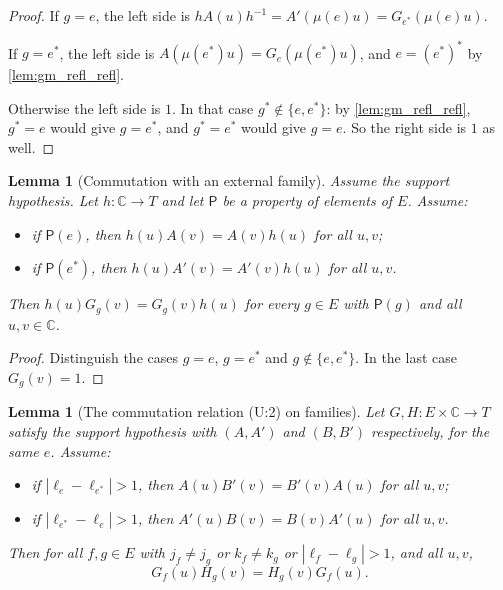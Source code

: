 \documentclass[11pt]{article}
\newtheorem{lemma}[theorem]{Lemma}
\theoremstyle{definition}
\theoremstyle{remark}
\newcommand{\CC}{\mathbb{C}}
\begin{document}
\begin{proof}
If $g=e$, the left side is $hA(u)h^{-1}=A'(\mu(e)u)=G_{e^\ast}(\mu(e)u)$.

If $g=e^\ast$, the left side is $A(\mu(e^\ast)u)=G_e(\mu(e^\ast)u)$, and $e=(e^\ast)^\ast$ by \cref{lem:gm_refl_refl}.

Otherwise the left side is $1$. In that case $g^\ast\notin\{e,e^\ast\}$: by \cref{lem:gm_refl_refl}, $g^\ast=e$ would give $g=e^\ast$, and $g^\ast=e^\ast$ would give $g=e$. So the right side is $1$ as well.
\end{proof}

\begin{lemma}[Commutation with an external family]\label{lem:gm_fam_comm1}
Assume the support hypothesis. Let $h\colon\CC\to T$ and let $\mathsf P$ be a property of elements of $E$. Assume:
\begin{itemize}
\item if $\mathsf P(e)$, then $h(u)A(v)=A(v)h(u)$ for all $u,v$;
\item if $\mathsf P(e^\ast)$, then $h(u)A'(v)=A'(v)h(u)$ for all $u,v$.
\end{itemize}
Then $h(u)G_g(v)=G_g(v)h(u)$ for every $g\in E$ with $\mathsf P(g)$ and all $u,v\in\CC$.
\end{lemma}

\begin{proof}
Distinguish the cases $g=e$, $g=e^\ast$ and $g\notin\{e,e^\ast\}$. In the last case $G_g(v)=1$.
\end{proof}

\begin{lemma}[The commutation relation (U:2) on families]\label{lem:gm_fam_U2}
Let $G,H\colon E\times\CC\to T$ satisfy the support hypothesis with $(A,A')$ and $(B,B')$ respectively, for the same $e$. Assume:
\begin{itemize}
\item if $|\ell_e-\ell_{e^\ast}|>1$, then $A(u)B'(v)=B'(v)A(u)$ for all $u,v$;
\item if $|\ell_{e^\ast}-\ell_e|>1$, then $A'(u)B(v)=B(v)A'(u)$ for all $u,v$.
\end{itemize}
Then for all $f,g\in E$ with $j_f\neq j_g$ or $k_f\neq k_g$ or $|\ell_f-\ell_g|>1$, and all $u,v$,
\[
G_f(u)H_g(v)=H_g(v)G_f(u).
\]
\end{lemma}
\end{document}
